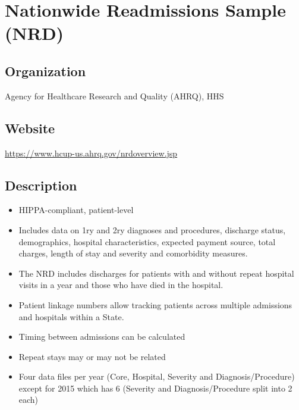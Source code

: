 \documentclass[
]{book}
\providecommand{\tightlist}{%
  \setlength{\itemsep}{0pt}\setlength{\parskip}{0pt}}
\begin{document}
\mainmatter

\hypertarget{nationwide-readmissions-sample-nrd}{%
\chapter{Nationwide Readmissions Sample (NRD)}\label{nationwide-readmissions-sample-nrd}}

\hypertarget{organization-71}{%
\section{Organization}\label{organization-71}}

Agency for Healthcare Research and Quality (AHRQ), HHS

\hypertarget{website-71}{%
\section{Website}\label{website-71}}

\url{https://www.hcup-us.ahrq.gov/nrdoverview.jsp}

\hypertarget{description-71}{%
\section{Description}\label{description-71}}

\begin{itemize}
\tightlist
\item
  HIPPA-compliant, patient-level
\item
  Includes data on 1ry and 2ry diagnoses and procedures, discharge status, demographics, hospital characteristics, expected payment source, total charges, length of stay and severity and comorbidity measures.
\item
  The NRD includes discharges for patients with and without repeat hospital visits in a year and those who have died in the hospital.
\item
  Patient linkage numbers allow tracking patients across multiple admissions and hospitals within a State.
\item
  Timing between admissions can be calculated
\item
  Repeat stays may or may not be related
\item
  Four data files per year (Core, Hospital, Severity and Diagnosis/Procedure) except for 2015 which has 6 (Severity and Diagnosis/Procedure split into 2 each)
\end{itemize}
\end{document}
